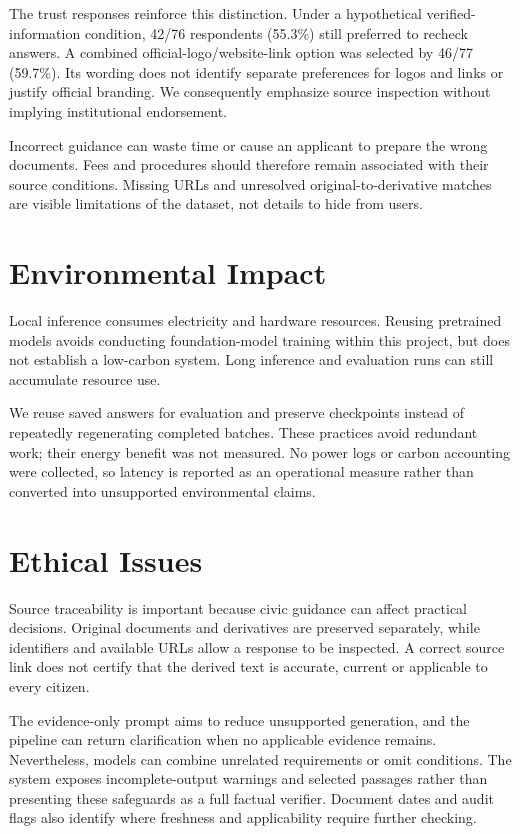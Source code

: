The trust responses reinforce this distinction. Under a hypothetical verified-information condition, 42/76 respondents (55.3\%) still preferred to recheck answers. A combined official-logo/website-link option was selected by 46/77 (59.7\%). Its wording does not identify separate preferences for logos and links or justify official branding. We consequently emphasize source inspection without implying institutional endorsement.

Incorrect guidance can waste time or cause an applicant to prepare the wrong documents. Fees and procedures should therefore remain associated with their source conditions. Missing URLs and unresolved original-to-derivative matches are visible limitations of the dataset, not details to hide from users.

\section{Environmental Impact}
Local inference consumes electricity and hardware resources. Reusing pretrained models avoids conducting foundation-model training within this project, but does not establish a low-carbon system. Long inference and evaluation runs can still accumulate resource use.

We reuse saved answers for evaluation and preserve checkpoints instead of repeatedly regenerating completed batches. These practices avoid redundant work; their energy benefit was not measured. No power logs or carbon accounting were collected, so latency is reported as an operational measure rather than converted into unsupported environmental claims.

\section{Ethical Issues}
Source traceability is important because civic guidance can affect practical decisions. Original documents and derivatives are preserved separately, while identifiers and available URLs allow a response to be inspected. A correct source link does not certify that the derived text is accurate, current or applicable to every citizen.

The evidence-only prompt aims to reduce unsupported generation, and the pipeline can return clarification when no applicable evidence remains. Nevertheless, models can combine unrelated requirements or omit conditions. The system exposes incomplete-output warnings and selected passages rather than presenting these safeguards as a full factual verifier. Document dates and audit flags also identify where freshness and applicability require further checking.


